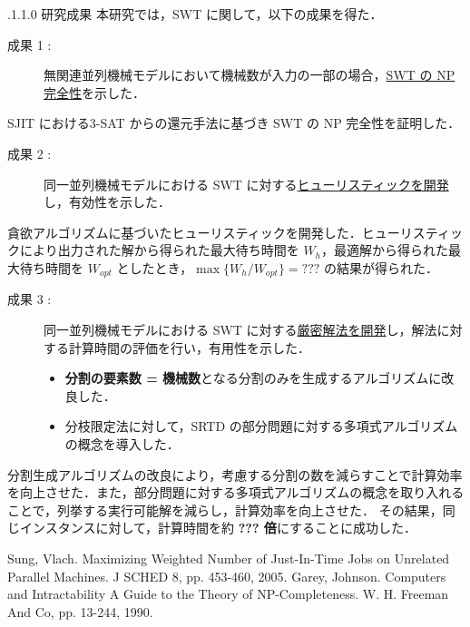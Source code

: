 \documentclass[oneside, 10pt, twocolumn]{jarticle}
\makeatletter
\def\section{\@startsection {section}{1}{\z@}{-3.5ex plus -1ex minus
-.2ex}{2.3 ex plus .2ex}{\large\bf}}
\renewcommand{\section}{
\@startsection{section}{1}{\z@}
{.1\Cvs \@plus.0\Cdp \@minus.1\Cdp}%
{.1\Cvs \@plus.1\Cdp \@minus.0\Cdp}%
{\reset@font\large\bfseries}}      %
\makeatother
\begin{document}
\section{研究成果}
本研究では，SWT に関して，以下の成果を得た．
\begin{description}
  \item[成果 1 : ]
  無関連並列機械モデルにおいて機械数が入力の一部の場合，\underline{SWT の NP 完全性}を示した．
\end{description}
SJIT における\textsc{3-SAT} からの還元手法に基づき SWT の NP 完全性を証明した．

\begin{description}
  \item[成果 2 : ]
  同一並列機械モデルにおける SWT に対する\underline{ヒューリスティックを開発}し，有効性を示した．
\end{description}
貪欲アルゴリズムに基づいたヒューリスティックを開発した．ヒューリスティックにより出力された解から得られた最大待ち時間を $W_h$，最適解から得られた最大待ち時間を $W_{opt}$ としたとき，\mbox{\boldmath $\max\big\{W_h/W_{opt}\big\} = ???$} の結果が得られた．

\begin{description}
  \item[成果 3 : ]
  同一並列機械モデルにおける SWT に対する\underline{厳密解法を開発}し，解法に対する計算時間の評価を行い，有用性を示した．
  \begin{itemize}
    \setlength{\leftskip}{-10mm}
    \item {\bf 分割の要素数 = 機械数}となる分割のみを生成するアルゴリズムに改良した．
    \item 分枝限定法に対して，SRTD の部分問題に対する多項式アルゴリズムの概念を導入した．
  \end{itemize}
\end{description}
分割生成アルゴリズムの改良により，考慮する分割の数を減らすことで計算効率を向上させた．また，部分問題に対する多項式アルゴリズムの概念を取り入れることで，列挙する実行可能解を減らし，計算効率を向上させた．
その結果，同じインスタンスに対して，計算時間を約 {\bf ??? 倍}にすることに成功した．

\begin{thebibliography}{9} %
  Sung, Vlach.
  Maximizing Weighted Number of Just-In-Time Jobs on Unrelated Parallel Machines. J SCHED 8, pp. 453-460, 2005.
  \vspace{-2mm}
  Garey, Johnson.
  Computers and Intractability A Guide to the Theory of NP-Completeness.
  W. H. Freeman And Co, pp. 13-244, 1990.
\end{thebibliography}
\end{document}
